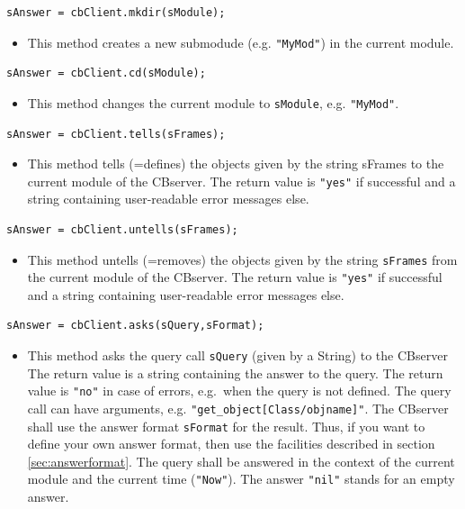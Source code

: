 \begin{verbatim}
sAnswer = cbClient.mkdir(sModule);
\end{verbatim}
\begin{itemize}
\item This method creates a new submodude (e.g. {\tt "MyMod"}) in the current module.
\end{itemize}

\begin{verbatim}
sAnswer = cbClient.cd(sModule);
\end{verbatim}
\begin{itemize}
\item This method changes the current module to {\tt sModule}, e.g. {\tt "MyMod"}.
\end{itemize}

\begin{verbatim}
sAnswer = cbClient.tells(sFrames);
\end{verbatim}
\begin{itemize}
\item This method tells (=defines) the objects given by the string sFrames to the
current module of the CBserver. 
The return value is {\tt "yes"} if successful and a string containing user-readable error messages else.
\end{itemize}

\begin{verbatim}
sAnswer = cbClient.untells(sFrames);
\end{verbatim}
\begin{itemize}
\item This method untells (=removes) the objects given by the string {\tt sFrames} from the
current module of the CBserver. 
The return value is {\tt "yes"} if successful and a string containing user-readable error messages else.
\end{itemize}

\begin{verbatim}
sAnswer = cbClient.asks(sQuery,sFormat);
\end{verbatim}
\begin{itemize}
\item This method asks the query call {\tt sQuery} (given by a String) to the CBserver 
The return value is a string containing the answer to the query.
The return value is {\tt "no"} in case of errors, e.g.\ when the query is not defined.
The query call can have arguments, e.g. {\tt "get\_object[Class/objname]"}. 
The CBserver shall use the answer format {\tt sFormat} for the result. Thus,
if you want to define your own answer format, then use the facilities
described in section \ref{sec:answerformat}. The query shall be answered
in the context of the current module and the current time ({\tt "Now"}).
The answer {\tt "nil"} stands for an empty answer.
\end{itemize}

